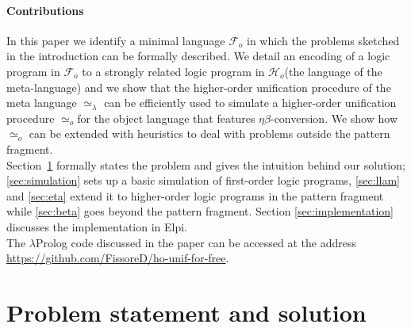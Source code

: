 \documentclass[sigconf,natbib=false,review]{acmart}
\def\githubUrl{\url{https://github.com/FissoreD/ho-unif-for-free}}
\newcommand{\UnifRel}{\ensuremath{\simeq}}
\newcommand{\Uo}{\texorpdfstring{\ensuremath{\UnifRel_o}\xspace}{unif\_o}}
\newcommand{\Ue}{\ensuremath{\UnifRel_\lambda}\xspace}
\newcommand{\llambda}{\ensuremath{\mathcal{L}}\xspace}
\newcommand{\Fo}{\texorpdfstring{\ensuremath{\mathcal{F}_{\!o}\xspace}}{Fo}} %
\newcommand{\Ho}{\texorpdfstring{\ensuremath{\mathcal{H}_o}\xspace}{Ho}}
\begin{document}
\paragraph{Contributions}
In this paper we identify a minimal language \Fo{} in which the problems
sketched in the introduction can be formally described.
We detail an encoding of a logic program in \Fo{} to a strongly related
logic program in \Ho (the language of the meta-language) and we show that
the higher-order unification procedure of the meta language \Ue{} can be
efficiently used to simulate a higher-order unification procedure \Uo for
the object language that features $\eta\beta$-conversion. We show how \Uo
can be extended with heuristics to deal with problems outside the pattern
fragment.\\
Section~\ref{sec:problem-statement} formally states the problem and gives the
intuition behind our solution; \cref{sec:simulation} sets up a basic
simulation of first-order logic programs, \cref{sec:llam} and \cref{sec:eta}
extend it to higher-order logic programs in the pattern fragment
while \cref{sec:beta} goes beyond the pattern fragment.
Section \ref{sec:implementation} discusses the implementation in Elpi.\\
The $\lambda$Prolog code discussed in the paper can be accessed at the
address \githubUrl.

\section{Problem statement and solution} %
\label{sec:problem-statement}

\newcommand{\specunif}[3]{
  \{#3_1, #3_2\} \subseteq \llambda \Rightarrow %
    \exists \rho, %
      \rho #3_1 #1 \rho #3_2  %
        \Leftrightarrow #3_1 #2 #3_2 \mapsto \rho' \subseteq \rho
}


\newcommand{\unifcorrect}[3]{
    \{#3_1, #3_2\} \subseteq \llambda \Rightarrow
      #3_1 #2 #3_2 \mapsto \rho
        \Rightarrow
          \rho #3_1 #1 \rho #3_2  %
}

\newcommand{\unifcomplete}[3]{
    \{#3_1, #3_2\} \subseteq \llambda \Rightarrow
        \rho #3_1 #1 \rho #3_2  %
          \Rightarrow \exists \rho', #3_1 #2 #3_2 \mapsto \rho' \land \rho' \subseteq \rho
}
\newcommand{\maybeeta}{\texorpdfstring{\ensuremath{\Diamond\eta}\xspace}{maybeeta}}
\newcommand{\maybebeta}{\texorpdfstring{\ensuremath{\Diamond\beta_0}\xspace}{maybebeta}}
\newcommand{\notllambda}{\texorpdfstring{\ensuremath{\Diamond\llambda}\xspace}{maybellam}}
\end{document}
